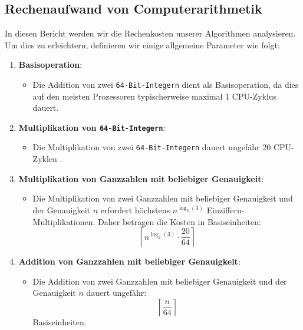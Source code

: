 \documentclass{scrartcl}
\theoremstyle{definition}
\newtheorem{approximation sequence}{Annäherungsfolge}
\begin{document}
\subsection{Rechenaufwand von Computerarithmetik}

In diesen Bericht werden wir die Rechenkosten unserer Algorithmen analysieren.
Um dies zu erleichtern, definieren wir einige allgemeine Parameter wie folgt:

\begin{enumerate}
    \item \textbf{Basisoperation}:
          \begin{itemize}
              \item Die Addition von zwei \texttt{64-Bit-Integern} dient als
                    Basisoperation, da dies auf den meisten Prozessoren
                    typischerweise maximal 1 CPU-Zyklus dauert.
          \end{itemize}

    \item \textbf{Multiplikation von \texttt{64-Bit-Integern}}:
          \begin{itemize}
              \item Die Multiplikation von zwei \texttt{64-Bit-Integern} dauert
                    ungefähr 20 CPU-Zyklen \cite{64-bit-Multiplication}.
          \end{itemize}

    \item \textbf{Multiplikation von Ganzzahlen mit beliebiger Genauigkeit}:
          \begin{itemize}
              \item Die Multiplikation von zwei Ganzzahlen mit beliebiger
                    Genauigkeit und der Genauigkeit \(n\) erfordert höchstens
                    \(n^{\log_2(3)}\) Einziffern-Multiplikationen. Daher
                    betragen die Kosten in Basiseinheiten:
                    \[
                        \left\lceil n^{\log_2(3)} \cdot \frac{20}{64} \right\rceil
                    \]
          \end{itemize}

    \item \textbf{Addition von Ganzzahlen mit beliebiger Genauigkeit}:
          \begin{itemize}
              \item Die Addition von zwei Ganzzahlen mit beliebiger Genauigkeit
                    und der Genauigkeit \(n\) dauert ungefähr:
                    \[
                        \left\lceil \frac{n}{64} \right\rceil
                    \]
                    Basiseinheiten.
          \end{itemize}


\end{enumerate}
\end{document}
